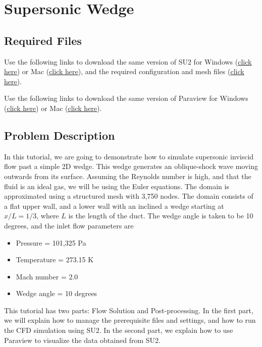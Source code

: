 \chapter{Supersonic Wedge}
\label{ch:Supersonic Wedge}
\section*{Required Files}
\begin{su2note}
	Use the following links to download the same version of SU2 for Windows (\href{https://users.encs.concordia.ca/~bvermeir/book/executables/windows/SU2_Windows.zip}{\underline{click here}}) or Mac (\href{https://users.encs.concordia.ca/~bvermeir/book/executables/osx/SU2_Mac.zip}{\underline{click here}}), and the required configuration and mesh files (\href{https://gitlab.com/bvermeir/book-cfd/blob/master/tutorial/tut2_supersonic_wedge/wedge.zip}{\underline{click here}}).
\end{su2note}
\begin{paraviewnote}
	Use the following links to download the same version of Paraview for Windows (\href{https://users.encs.concordia.ca/~bvermeir/book/executables/windows/ParaView-5.4.0-Qt5-OpenGL2-Windows-64bit.exe}{\underline{click here}}) or Mac (\href{https://users.encs.concordia.ca/~bvermeir/book/executables/osx/ParaView-5.4.0-Qt5-OpenGL2-MPI-OSX10.8-64bit.dmg}{\underline{click here}}).
\end{paraviewnote}

\section*{Problem Description}
In this tutorial, we are going to demonstrate how to simulate supersonic inviscid flow past a simple 2D wedge. This wedge generates an oblique-shock wave moving outwards from its surface. Assuming the Reynolds number is high, and that the fluid is an ideal gas, we will be using the Euler equations. The domain is approximated using a structured mesh with 3,750 nodes. The domain consists of a flat upper wall, and a lower wall with an inclined a wedge starting at $x/L=1/3$, where $L$ is the length of the duct. The wedge angle is taken to be 10 degrees, and the inlet flow parameters are
\begin{itemize}
    \item Pressure = 101,325 Pa
    \item Temperature = 273.15 K
    \item Mach number = 2.0
    \item Wedge angle = 10 degrees
\end{itemize}
This tutorial has two parts: Flow Solution and Post-processing. In the first part, we will explain how to manage the prerequisite files and settings, and how to run the CFD simulation using SU2. In the second part, we explain how to use Paraview to visualize the data obtained from SU2.
